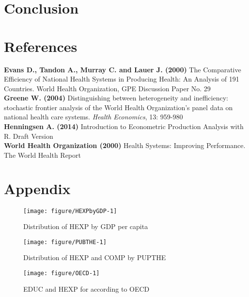 \documentclass[12pt,a4paper]{article}\usepackage[]{graphicx}\usepackage[]{color}
\begin{document}
\section{Conclusion}



\newpage
\section{References}
\textbf{Evans D., Tandon A., Murray C. and Lauer J. (2000)} The Comparative Efficiency of National Health Systems in Producing Health: An Analysis of 191 Countries. World Health Organization, GPE Discussion Paper No. 29 \\

\textbf{Greene W. (2004)} Distinguishing between heterogeneity and inefficiency: stochastic frontier analysis of the World Health Organization's panel data on national health care systems. \textit{Health Economics}, 13: 959-980 \\

\textbf{Henningsen A. (2014)} Introduction to Econometric Production Analysis with R. Draft Version \\

\textbf{World Health Organization (2000)} Health Systems: Improving Performance. The World Health Report



\newpage
\section{Appendix}
\begin{figure}[!htbp]

{\centering \texttt{[image: figure/HEXPbyGDP-1]} 

}

\caption[Distribution of HEXP by GDP per capita]{Distribution of HEXP by GDP per capita}\label{fig:HEXPbyGDP}
\end{figure}


\begin{figure}[!htbp]

{\centering \texttt{[image: figure/PUBTHE-1]} 

}

\caption[Distribution of HEXP and COMP by PUPTHE]{Distribution of HEXP and COMP by PUPTHE}\label{fig:PUBTHE}
\end{figure}


\begin{figure}[!htbp]

{\centering \texttt{[image: figure/OECD-1]} 

}

\caption[EDUC and HEXP for according to OECD]{EDUC and HEXP for according to OECD}\label{fig:OECD}
\end{figure}
\end{document}
